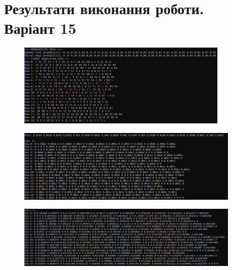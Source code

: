 \section{Результати виконання роботи. Варіант 15}
\begin{figure}[!ht]
    \centering
    \begin{minipage}{0.95\linewidth}
        \includegraphics[width=0.9\textwidth, scale = 2.0]{ReportPic/report_1.png}
    \end{minipage}
\end{figure}
\newpage
\begin{figure}[!ht]
        \centering
        \begin{minipage}{0.95\linewidth}
            \includegraphics[width=0.95\textwidth, scale=1.2]{ReportPic/report_2.png} %
        \end{minipage}
\end{figure}
\begin{figure}[!ht]
        \centering
        \begin{minipage}{0.95\linewidth}
            \includegraphics[width=0.95\textwidth, scale=1.2]{ReportPic/report_3.png}
        \end{minipage}
\end{figure}

